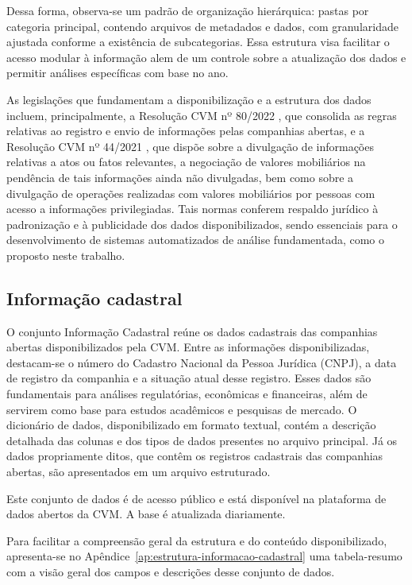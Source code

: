 Dessa forma, observa-se um padrão de organização hierárquica: pastas por categoria principal, contendo arquivos de metadados e dados, com granularidade ajustada conforme a existência de subcategorias. Essa estrutura visa facilitar o acesso modular à informação alem de um controle sobre a atualização dos dados e permitir análises específicas com base no ano.

As legislações que fundamentam a disponibilização e a estrutura dos dados incluem, principalmente, a Resolução CVM nº 80/2022 \cite{cvm:2022:resolucao80}, que consolida as regras relativas ao registro e envio de informações pelas companhias abertas, e a Resolução CVM nº 44/2021 \cite{cvm:2021:resolucao44}, que dispõe sobre a divulgação de informações relativas a atos ou fatos relevantes, a negociação de valores mobiliários na pendência de tais informações ainda não divulgadas, bem como sobre a divulgação de operações realizadas com valores mobiliários por pessoas com acesso a informações privilegiadas. Tais normas conferem respaldo jurídico à padronização e à publicidade dos dados disponibilizados, sendo essenciais para o desenvolvimento de sistemas automatizados de análise fundamentada, como o proposto neste trabalho.


\subsection{Informação cadastral} 

O conjunto Informação Cadastral reúne os dados cadastrais das companhias abertas disponibilizados pela CVM. Entre as informações disponibilizadas, destacam-se o número do Cadastro Nacional da Pessoa Jurídica (CNPJ), a data de registro da companhia e a situação atual desse registro. Esses dados são fundamentais para análises regulatórias, econômicas e financeiras, além de servirem como base para estudos acadêmicos e pesquisas de mercado. O dicionário de dados, disponibilizado em formato textual, contém a descrição detalhada das colunas e dos tipos de dados presentes no arquivo principal. Já os dados propriamente ditos, que contêm os registros cadastrais das companhias abertas, são apresentados em um arquivo estruturado.

Este conjunto de dados é de acesso público e está disponível na plataforma de dados abertos da CVM. A base é atualizada diariamente.

Para facilitar a compreensão geral da estrutura e do conteúdo disponibilizado, apresenta-se no Apêndice~\ref{ap:estrutura-informacao-cadastral} uma tabela-resumo com a visão geral dos campos e descrições desse conjunto de dados.


